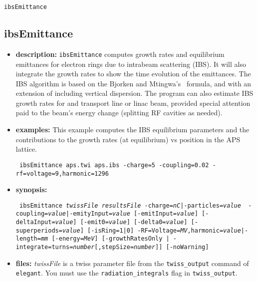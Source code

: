\documentclass[11pt]{article}
\begin{document}
\newpage
\begin{center}{\Large\verb|ibsEmittance|}\end{center}
\subsection{ibsEmittance}

\begin{itemize}
\item {\bf description:} \verb|ibsEmittance| computes growth rates and
equilibrium emittances for electron rings due to intrabeam scattering
(IBS).  It will also integrate the growth rates to show the time
evolution of the emittances.  The IBS algorithm is based on the
Bjorken and Mtingwa's~\cite{BM} formula, and with an extension of including vertical
dispersion. The program can also estimate IBS growth rates
for and transport line or linac beam, provided special attention paid to the beam's energy
change (splitting RF cavities as needed). 

\item {\bf examples:}
This example computes the IBS equilibrium parameters and the contributions to the
growth rates (at equilibrium) vs position in the APS lattice.
\begin{flushleft}{\tt 
ibsEmittance aps.twi aps.ibs -charge=5 -coupling=0.02 -rf=voltage=9,harmonic=1296
}\end{flushleft}

\item {\bf synopsis:}
\begin{flushleft}{\tt 
ibsEmittance {\em twissFile} {\em resultsFile}
 {-charge={\em nC}|-particles={\em value} } {-coupling={\em value}|-emityInput={\em value}}
 [-emitInput={\em value}] [-deltaInput={\em value}]
 [-emit0={\em value}] [-delta0={\em value}]
 [-superperiods={\em value}] [-isRing=1|0]
 {-RF=Voltage={\em MV},harmonic={\em value}|-length={\em mm}}
 [-energy={\em MeV}] 
 [{-growthRatesOnly | -integrate=turns={\em number}[,stepSize={\em number}]}]
 [-noWarning] 
}\end{flushleft}

\item {\bf files:}
{\em twissFile} is a twiss parameter file from the \verb|twiss_output| command of
{\tt elegant}.    You must use the \verb|radiation_integrals| flag in \verb|twiss_output|.


\end{itemize}
\end{document}

